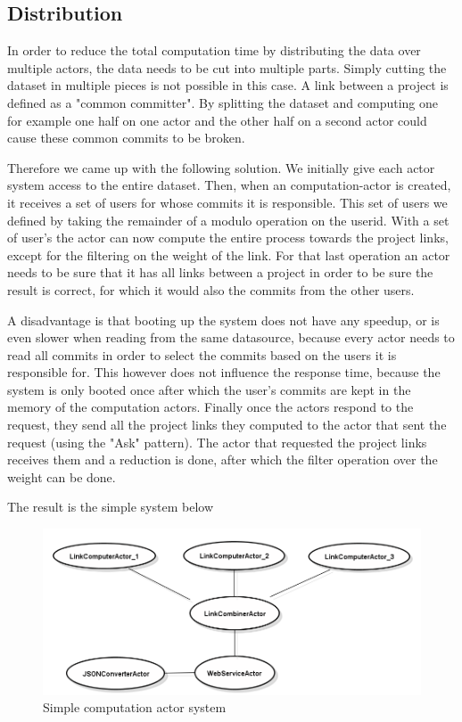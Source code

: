 \documentclass[10pt,a4paper]{article}
\begin{document}
\subsection{Distribution}

In order to reduce the total computation time by distributing the data over multiple actors, the data needs to be cut into multiple parts. Simply cutting the dataset in multiple pieces is not possible in this case. A link between a project is defined as a "common committer". By splitting the dataset and computing one for example one half on one actor and the other half on a second actor could cause these common commits to be broken. 


Therefore we came up with the following solution. We initially give each actor system access to the entire dataset. Then, when an computation-actor is created, it receives a set of users for whose commits it is responsible. This set of users we defined by taking the remainder of a modulo operation on the userid. With a set of user's the actor can now compute the entire process towards the project links, except for the filtering on the weight of the link. For that last operation an actor needs to be sure that it has all links between a project in order to be sure the result is correct, for which it would also the commits from the other users.

A disadvantage is that booting up the system does not have any speedup, or is even slower when reading from the same datasource, because every actor needs to read all commits in order to select the commits based on the users it is responsible for. This however does not influence the response time, because the system is only booted once after which the user's commits are kept in the memory of the computation actors. Finally once the actors respond to the request, they send all the project links they computed to the actor that sent the request (using the "Ask" pattern). The actor that requested the project links receives them and a reduction is done, after which the filter operation over the weight can be done.

The result is the simple system below

\begin{figure}[htb]
    \centering
    \includegraphics[width=1.00\textwidth]{ActorSystemSample}
    \caption{Simple computation actor system}
    \label{fig:actor_sample}
\end{figure}
\end{document}
